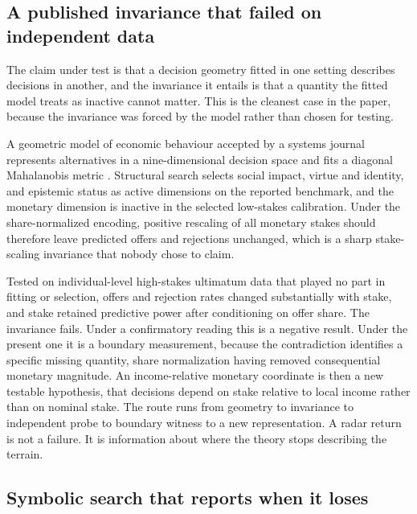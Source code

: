 \documentclass[11pt]{article}
\theoremstyle{remark}
\begin{document}
\subsection{A published invariance that failed on independent data}

The claim under test is that a decision geometry fitted in one setting describes
decisions in another, and the invariance it entails is that a quantity the fitted
model treats as inactive cannot matter. This is the cleanest case in the paper,
because the invariance was forced by the model rather than chosen for testing.

A geometric model of economic behaviour accepted by a systems journal represents
alternatives in a nine-dimensional decision space and fits a diagonal Mahalanobis
metric \citep{bond2026tcss}. Structural search selects social impact, virtue and
identity, and epistemic status as active dimensions on the reported benchmark, and
the monetary dimension is inactive in the selected low-stakes calibration. Under
the share-normalized encoding, positive rescaling of all monetary stakes should
therefore leave predicted offers and rejections unchanged, which is a sharp
stake-scaling invariance that nobody chose to claim.

Tested on individual-level high-stakes ultimatum data that played no part in
fitting or selection, offers and rejection rates changed substantially with stake,
and stake retained predictive power after conditioning on offer share. The
invariance fails. Under a confirmatory reading this is a negative result. Under the
present one it is a boundary measurement, because the contradiction identifies a
specific missing quantity, share normalization having removed consequential
monetary magnitude. An income-relative monetary coordinate is then a new testable
hypothesis, that decisions depend on stake relative to local income rather than on
nominal stake. The route runs from geometry to invariance to independent probe to
boundary witness to a new representation. A radar return is not a failure. It is
information about where the theory stops describing the terrain.

\subsection{Symbolic search that reports when it loses}
\end{document}
